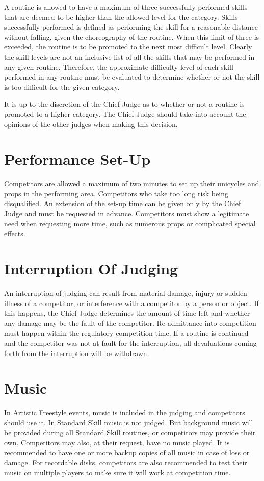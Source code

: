 A routine is allowed to have a maximum of three successfully performed skills that are deemed to be higher than the allowed level for the category.
Skills successfully performed is defined as performing the skill for a reasonable distance without falling, given the choreography of the routine.
When this limit of three is exceeded, the routine is to be promoted to the next most difficult level.
Clearly the skill levels are not an inclusive list of all the skills that may be performed in any given routine.
Therefore, the approximate difficulty level of each skill performed in any routine must be evaluated to determine whether or not the skill is too difficult for the given category.

It is up to the discretion of the Chief Judge as to whether or not a routine is promoted to a higher category.
The Chief Judge should take into account the opinions of the other judges when making this decision.

\section{Performance Set-Up}
Competitors are allowed a maximum of two minutes to set up their unicycles and props in the performing area.
Competitors who take too long risk being disqualified.
An extension of the set-up time can be given only by the Chief Judge and must be requested in advance.
Competitors must show a legitimate need when requesting more time, such as numerous props or complicated special effects.

\section{Interruption Of Judging}
An interruption of judging can result from material damage, injury or sudden illness of a competitor, or interference with a competitor by a person or object.
If this happens, the Chief Judge determines the amount of time left and whether any damage may be the fault of the competitor.
Re-admittance into competition must happen within the regulatory competition time.
If a routine is continued and the competitor was not at fault for the interruption, all devaluations coming forth from the interruption will be withdrawn.

\section{Music \label{sec:freestyle_music}}
In Artistic Freestyle events, music is included in the judging and competitors should use it.
In Standard Skill music is not judged.
But background music will be provided during all Standard Skill routines, or competitors may provide their own.
Competitors may also, at their request, have no music played.
It is recommended to have one or more backup copies of all music in case of loss or damage.
For recordable disks, competitors are also recommended to test their music on multiple players to make sure it will work at competition time.

